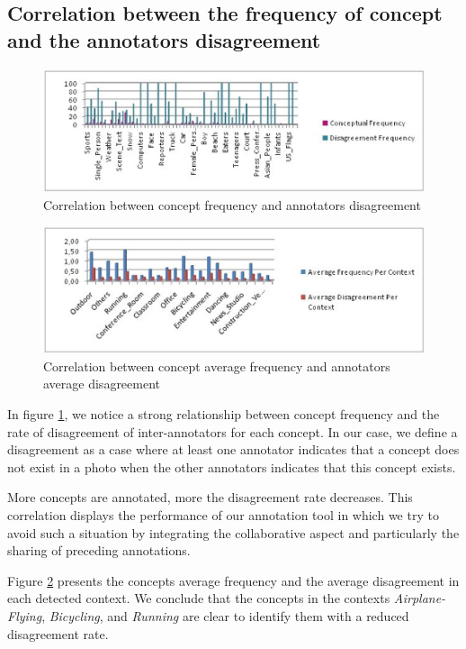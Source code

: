 	\subsection{Correlation between the frequency of concept and the annotators disagreement}
\begin{figure}[ht!]	
			\centering
			\includegraphics[scale=0.3]{graphics/figb}
			\caption{Correlation between concept frequency and annotators disagreement}
			\label{figb}
		\end{figure}
		\begin{figure}[ht!]	
			\centering
			\includegraphics[scale=0.3]{graphics/figc}
			\caption{Correlation between concept average frequency and annotators average disagreement}
			\label{figc}
		\end{figure}
In figure \ref{figb}, we notice a strong relationship between concept frequency and the rate of  disagreement of inter-annotators for each concept. In our case, we define a  disagreement as a case where at least one annotator indicates that a concept does not exist in a photo when the other annotators indicates that this concept exists. 

More concepts are annotated, more the disagreement rate decreases. This correlation  displays the performance of our annotation tool in which we try to avoid such a situation by integrating the collaborative aspect and particularly the sharing of preceding annotations.

Figure \ref{figc} presents the concepts average  frequency and the average disagreement in each detected context. We conclude that the concepts in the contexts \textit{Airplane-Flying}, \textit{Bicycling}, and \textit{Running} are clear to identify them with a reduced disagreement rate.

